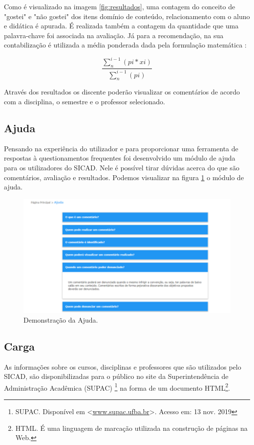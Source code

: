 \documentclass[12pt, a4paper]{report}
\begin{document}
Como é visualizado na imagem \ref{fig:resultados}, uma contagem do conceito de "gostei" e "não gostei" dos itens domínio de conteúdo, relacionamento com o aluno e didática é apurada. É realizada também a contagem da quantidade que uma palavra-chave foi associada na avaliação. Já para a recomendação, na sua contabilização é utilizada a média ponderada dada pela formulação matemática :

\begin{equation}
\frac{\sum_{n}^{i-1}(pi*xi)}{\sum_{n}^{i-1}(pi)} 
\end{equation}

Através dos resultados os discente poderão visualizar os comentários de acordo com a disciplina, o semestre e o professor selecionado.

\subsection{Ajuda}

Pensando na experiência do utilizador e para proporcionar uma ferramenta de respostas à questionamentos frequentes foi desenvolvido um módulo de ajuda para os utilizadores do SICAD. Nele é possível tirar dúvidas acerca do que são comentários, avaliação e resultados. Podemos visualizar na figura \ref{fig:ajuda} o módulo de ajuda.

\begin{figure}
\centering
\includegraphics[scale=0.9]{ajuda.png}
\caption{Demonstração da Ajuda.}
\label{fig:ajuda}
\end{figure}

\subsection{Carga}
As informações sobre os cursos, disciplinas e professores que são utilizados pelo SICAD, são disponibilizadas para o público no site da Superintendência de Administração Acadêmica (SUPAC) \footnote{SUPAC. Disponível em <\url{www.supac.ufba.br}>. Acesso em: 13 nov. 2019} na forma de um documento HTML\footnote{HTML. É  uma linguagem de marcação utilizada na construção de páginas na Web.}.
\end{document}
